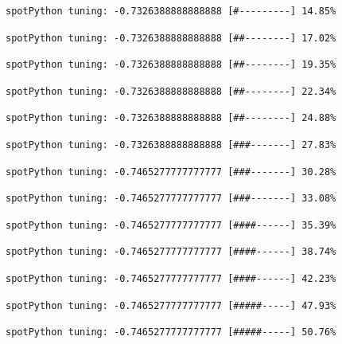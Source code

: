 \documentclass[
  letterpaper,
  DIV=11,
  numbers=noendperiod]{scrreprt}
\begin{document}
\begin{verbatim}
spotPython tuning: -0.7326388888888888 [#---------] 14.85% 
\end{verbatim}

\begin{verbatim}
spotPython tuning: -0.7326388888888888 [##--------] 17.02% 
\end{verbatim}

\begin{verbatim}
spotPython tuning: -0.7326388888888888 [##--------] 19.35% 
\end{verbatim}

\begin{verbatim}
spotPython tuning: -0.7326388888888888 [##--------] 22.34% 
\end{verbatim}

\begin{verbatim}
spotPython tuning: -0.7326388888888888 [##--------] 24.88% 
\end{verbatim}

\begin{verbatim}
spotPython tuning: -0.7326388888888888 [###-------] 27.83% 
\end{verbatim}

\begin{verbatim}
spotPython tuning: -0.7465277777777777 [###-------] 30.28% 
\end{verbatim}

\begin{verbatim}
spotPython tuning: -0.7465277777777777 [###-------] 33.08% 
\end{verbatim}

\begin{verbatim}
spotPython tuning: -0.7465277777777777 [####------] 35.39% 
\end{verbatim}

\begin{verbatim}
spotPython tuning: -0.7465277777777777 [####------] 38.74% 
\end{verbatim}

\begin{verbatim}
spotPython tuning: -0.7465277777777777 [####------] 42.23% 
\end{verbatim}

\begin{verbatim}
spotPython tuning: -0.7465277777777777 [#####-----] 47.93% 
\end{verbatim}

\begin{verbatim}
spotPython tuning: -0.7465277777777777 [#####-----] 50.76% 
\end{verbatim}
\end{document}
